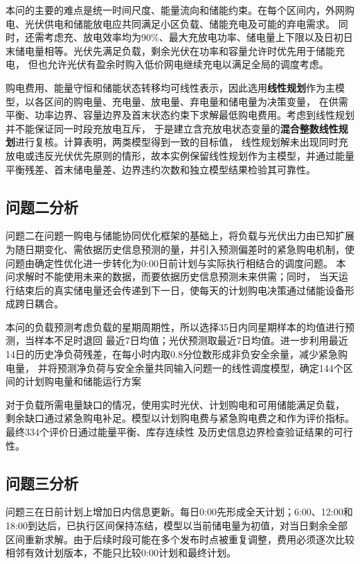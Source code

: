 \documentclass[UTF8,a4paper,12pt]{ctexart}
\begin{document}
本问的主要的难点是统一时间尺度、能量流向和储能约束。在每个区间内，外网购电、光伏供电和储能放电应共同满足小区负载、储能充电及可能的弃电需求。
同时，还需考虑充、放电效率均为90\%、最大充放电功率、储电量上下限以及日初日末储电量相等。光伏先满足负载，剩余光伏在功率和容量允许时优先用于储能充电，
但也允许光伏有盈余时购入低价网电继续充电以满足全局的调度考虑。

购电费用、能量守恒和储能状态转移均可线性表示，因此选用\textbf{线性规划}作为主模型，以各区间的购电量、充电量、放电量、弃电量和储电量为决策变量，
在供需平衡、功率边界、容量边界及首末状态约束下求解最低购电费用。考虑到线性规划并不能保证同一时段充放电互斥，
于是建立含充放电状态变量的\textbf{混合整数线性规划}进行复核。计算表明，两类模型得到一致的目标值，
线性规划解未出现同时充放电或违反光伏优先原则的情形，故本实例保留线性规划作为主模型，并通过能量平衡残差、首末储电量差、边界违约次数和独立模型结果检验其可靠性。

\subsection{问题二分析}
问题二在问题一购电与储能协同优化框架的基础上，将负载与光伏出力由已知扩展为随日期变化、需依据历史信息预测的量，并引入预测偏差时的紧急购电机制，使问题由确定性优化进一步转化为0:00日前计划与实际执行相结合的调度问题。
本问求解时不能使用未来的数据，而要依据历史信息预测未来供需；同时，
当天运行结束后的真实储电量还会传递到下一日，使每天的计划购电决策通过储能设备形成跨日耦合。

本问的负载预测考虑负载的星期周期性，所以选择35日内同星期样本的均值进行预测，当样本不足时退回
最近7日均值；光伏预测取最近7日均值。进一步利用最近14日的历史净负荷残差，在每小时内取0.8分位数形成非负安全余量，减少紧急购电量，
并将预测净负荷与安全余量共同输入问题一的线性调度模型，确定144个区间的计划购电量和储能运行方案

对于负载所需电量缺口的情况，使用实时光伏、计划购电和可用储能满足负载，
剩余缺口通过紧急购电补足。模型以计划购电费与紧急购电费之和作为评价指标。
最终334个评价日通过能量平衡、库存连续性
及历史信息边界检查验证结果的可行性。

\subsection{问题三分析}
问题三在日前计划上增加日内信息更新。每日0:00先形成全天计划；6:00、12:00和18:00到达后，已执行区间保持冻结，模型以当前储电量为初值，对当日剩余全部区间重新求解。由于后续时段可能在多个发布时点被重复调整，费用必须逐次比较相邻有效计划版本，不能只比较0:00计划和最终计划。
\end{document}
